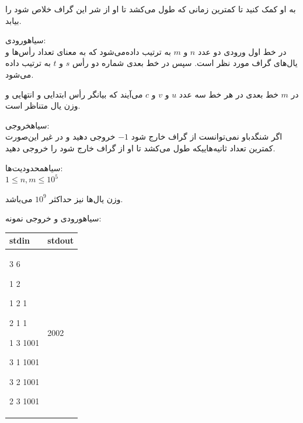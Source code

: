 به او کمک کنید تا کمترین زمانی که طول می‌کشد تا او از شر این گراف خلاص شود را بیابد.

\noindent
{}‌سیاه{ورودی:}\\
در خط اول ورودی دو عدد $n$ و $m$ به ترتیب داده‌می‌شود که به معنای تعداد رأس‌ها و یال‌های گراف مورد نظر است. سپس در خط بعدی شماره دو رأس $s$ و $t$ به ترتیب داده می‌شود.

در $m$ خط بعدی در هر خط سه عدد $u$ و $v$ و $c$ می‌آیند که بیانگر رأس ابتدایی و انتهایی و وزن یال متناظر است.

\noindent
{}‌سیاه{خروجی:}\\
اگر شنگدباو نمی‌توانست از گراف خارج شود $-1$ خروجی دهید و در غیر این‌صورت کمترین تعداد ثانیه‌هاییکه طول می‌کشد تا او از گراف خارج شود را خروجی دهید.

‌سیاه{محدودیت‌ها:}\\
$1 \le n, m \le 10^5$

وزن یال‌ها نیز حداکثر $10^9$ می‌باشد.

‌سیاه{ورودی و خروجی نمونه:}\\
\begin{latin}
\begin{tabularx}{\textwidth}{|X | X|}
	\hline
	\textbf{stdin} &
	\textbf{stdout}\\
	\hline
	3 6
	
	1 2
	
	1 2 1
	
	2 1 1
	
	1 3 1001
	
	3 1 1001
	
	3 2 1001
	
	2 3 1001&
	2002\\
	\hline	
\end{tabularx}
\end{latin}

\solution{
}






